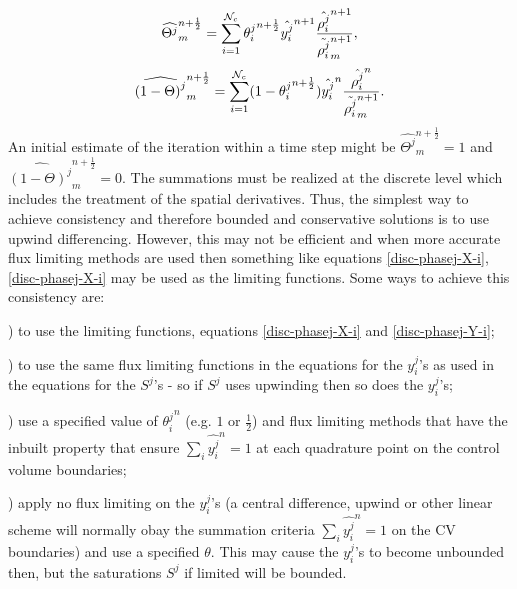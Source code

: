 \begin{eqnarray}
\widehat{{\Theta}^j}_m^{n+\frac{1}{2}}
=\sum_{i=1}^{{\cal N}_c} {\theta_i^j}^{n+\frac{1}{2}}\hat{y_{i}^{j}}^{n+1}
\frac{\hat{\rho_i^{j}}^{n+1}}{ \tilde{\rho_i^{j}}^{n+1}_m} ,
\label{disc-phasej-X-i}
\end{eqnarray}
\begin{eqnarray}
\widehat{{(1-\Theta)}^j}_m^{n+\frac{1}{2}}
= \sum_{i=1}^{{\cal N}_c} (1-{\theta_i^j}^{n+\frac{1}{2}})
\hat{y_{i}^{j}}^n \frac{\hat{\rho_i^{j}}^{n}}{\tilde{\rho_i^{j}}^{n+1}_m}  .
\label{disc-phasej-Y-i}
\end{eqnarray}
An initial estimate of the iteration within a
time step might be
$\widehat{{\Theta}^j}_m^{n+\frac{1}{2}}=1$
and
$\widehat{{(1-\Theta)}^j}_m^{n+\frac{1}{2}}=0$.
The summations must be realized
at the discrete level which includes the treatment of the spatial derivatives.
Thus, the simplest way to achieve consistency and therefore bounded
and conservative solutions is to use upwind differencing.
However, this may not be efficient and when more accurate
flux limiting methods are used then something like equations \ref{disc-phasej-X-i}, \ref{disc-phasej-X-i} may be used as the
limiting functions.
Some ways
to achieve this consistency are:
\par{}) to use the limiting functions,
equations \ref{disc-phasej-X-i} and \ref{disc-phasej-Y-i};
\par{}) to use the same flux limiting
functions in the equations for the $y_i^j$'s as used in
the equations for the $S^j$'s - so if  $S^j$ uses upwinding
then so does the $y_i^j$'s;
\par{}) use a
specified value of ${\theta_i^j}^n$ (e.g. $1$ or $\frac{1}{2}$) and
flux limiting methods that have the inbuilt property that ensure
$\sum_i \hat{y_{i}^{j}}^n=1$ at each quadrature point on the control
volume boundaries;
\par{}) apply no flux limiting on the $y_i^j$'s (a central
difference, upwind or other linear scheme will normally
obay the summation criteria $\sum_i \hat{y_{i}^{j}}^n=1$
on the CV boundaries) and use a specified $\theta$.
This may cause the $y_i^j$'s to
become unbounded then, but the saturations $S^j$ if limited will
be bounded.



